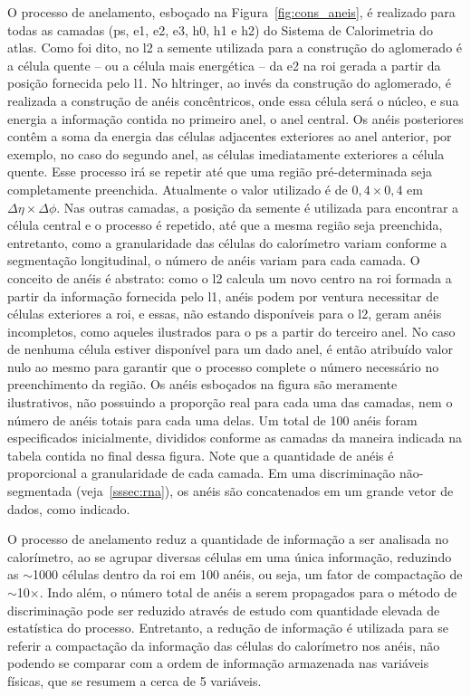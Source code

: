 O processo de anelamento, esboçado na Figura~\ref{fig:cons_aneis}, é realizado
para todas as camadas (\gls{ps}, \gls{e1}, \gls{e2}, \gls{e3}, \gls{h0},
\gls{h1} e \gls{h2}) do Sistema de Calorimetria do \gls{atlas}. Como foi dito,
no \gls{l2} a semente utilizada para a construção do aglomerado é a célula quente  -- ou a célula mais
energética -- da \gls{e2} na \gls{roi} gerada a partir da posição 
fornecida pelo \gls{l1}. No \gls{hltringer}, ao invés da construção do
aglomerado, é realizada a construção de anéis concêntricos, onde essa célula
será o núcleo, e sua energia a informação contida no primeiro anel, o anel central. 
Os anéis posteriores contêm a soma da energia das células adjacentes
exteriores ao anel anterior, por exemplo, no caso do segundo anel, as células imediatamente
exteriores a célula quente. Esse processo irá se repetir até que uma região pré-determinada seja
completamente preenchida. Atualmente o valor utilizado é de $0,4\times0,4$ em
$\Delta\eta\times\Delta\phi$. Nas outras camadas, a posição da
semente é utilizada para encontrar a célula central e o processo é repetido, até
que a mesma região seja preenchida, entretanto, como a granularidade das células
do calorímetro variam conforme a segmentação longitudinal, o número de anéis variam
para cada camada. O conceito de anéis é abstrato: como o \gls{l2} calcula
um novo centro na \gls{roi} formada a partir da informação fornecida pelo
\gls{l1}, anéis podem por ventura necessitar de células exteriores a \gls{roi},
e essas, não estando disponíveis para o \gls{l2}, geram anéis incompletos,
como aqueles ilustrados para o \gls{ps} a partir do terceiro anel. 
No caso de nenhuma célula estiver disponível para um dado anel, é então atribuído valor
nulo ao mesmo para garantir que o processo complete o número necessário no
preenchimento da região. Os anéis esboçados na figura são meramente
ilustrativos, não possuindo a proporção real para cada uma das camadas, nem o
número de anéis totais para cada uma delas. Um total de 100 anéis foram 
especificados inicialmente, divididos conforme as camadas da maneira indicada na
tabela contida no final dessa figura. Note que a quantidade de anéis é proporcional 
a granularidade de cada camada. Em uma discriminação não-segmentada
(veja~\ref{sssec:rna}), os anéis são concatenados em um grande vetor de dados,
como indicado.

O processo de anelamento reduz a quantidade de informação a ser analisada no
calorímetro, ao se agrupar diversas células em uma única informação, reduzindo
as $\sim$1000 células dentro da \gls{roi} em 100 anéis, ou seja, um fator de
compactação de $\sim$10$\times$. Indo além, o número total de anéis a serem
propagados para o método de discriminação pode ser reduzido através de estudo
com quantidade elevada de estatística do processo. Entretanto, a redução de informação 
é utilizada para se referir a compactação da
informação das células do calorímetro nos anéis, não podendo se comparar 
com a ordem de informação armazenada nas variáveis físicas, 
que se resumem a cerca de 5 variáveis.

